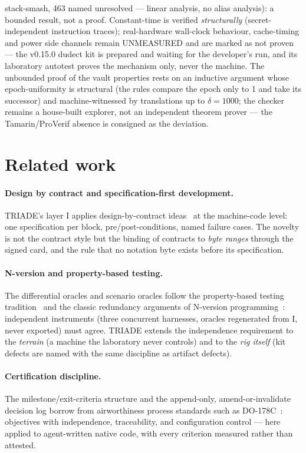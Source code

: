\documentclass[11pt,a4paper]{article}
\begin{document}
stack-smash, 463 named unresolved --- linear analysis, no alias
analysis): a bounded result, not a proof. Constant-time is verified
\emph{structurally} (secret-independent instruction traces); real-hardware
wall-clock behaviour, cache-timing and power side channels remain
UNMEASURED and are marked as not proven --- the v0.15.0 dudect kit is prepared
and waiting for the developer's run, and its laboratory autotest
proves the mechanism only, never the machine. The unbounded proof of
the vault properties rests on an inductive argument whose
epoch-uniformity is structural (the rules compare the epoch only to
1 and take its successor) and machine-witnessed by translations up
to $\delta = 1000$; the checker remains a house-built explorer, not
an independent theorem prover --- the Tamarin/ProVerif absence is
consigned as the deviation.

\section{Related work}\label{sec:related}

\paragraph{Design by contract and specification-first development.}
TRIADE's layer I applies design-by-contract ideas~\cite{meyer1992} at the
machine-code level: one specification per block, pre/post-conditions,
named failure cases. The novelty is not the contract style but the
binding of contracts to \emph{byte ranges} through the signed card, and
the rule that no notation byte exists before its specification.

\paragraph{N-version and property-based testing.} The differential
oracles and scenario oracles follow the property-based testing
tradition~\cite{claessen2000} and the classic redundancy arguments of
N-version programming~\cite{avizienis1985}: independent instruments (three
concurrent harnesses, oracles regenerated from I, never exported) must
agree. TRIADE extends the independence requirement to the \emph{terrain}
(a machine the laboratory never controls) and to the \emph{rig itself}
(kit defects are named with the same discipline as artifact defects).

\paragraph{Certification discipline.} The milestone/exit-criteria
structure and the append-only, amend-or-invalidate decision log borrow
from airworthiness process standards such as
DO-178C~\cite{do178c}: objectives with independence, traceability, and
configuration control --- here applied to agent-written native code, with
every criterion measured rather than attested.
\end{document}

